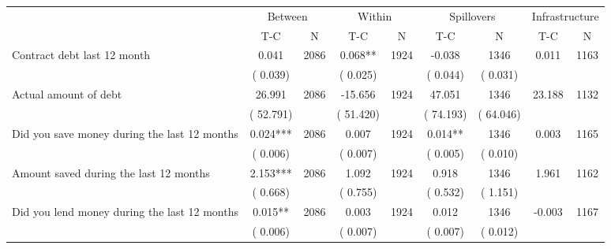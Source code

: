 
\begin{tabular}{l*{8}{c}}\hline&\multicolumn{2}{c}{Between}&\multicolumn{2}{c}{Within}&\multicolumn{2}{c}{Spillovers}&\multicolumn{2}{c}{Infrastructure}\\ \cmidrule(r){2-3}\cmidrule(l){4-5}\cmidrule(l){6-7}\cmidrule(l){8-9} & {T-C} & {N} & {T-C} & {N}  & {T-C}  & {N} & {T-C}  & {N} \\ \midrule
Contract debt last 12 month        &              0.041      &       2086       &              0.068**      &       1924       &             -0.038      &       1346  &        0.011 &       1163       \\
                       &       (       0.039)            &                               &       (       0.025)            &                               &       (       0.044)            &       (       0.031) &                  \\
Actual amount of debt        &             26.991      &       2086       &            -15.656      &       1924       &             47.051      &       1346  &       23.188 &       1132       \\
                       &       (      52.791)            &                               &       (      51.420)            &                               &       (      74.193)            &       (      64.046) &                  \\
Did you save money during the last 12 months        &              0.024***      &       2086       &              0.007      &       1924       &              0.014**      &       1346  &        0.003 &       1165       \\
                       &       (       0.006)            &                               &       (       0.007)            &                               &       (       0.005)            &       (       0.010) &                  \\
Amount saved during the last 12 months        &              2.153***      &       2086       &              1.092      &       1924       &              0.918      &       1346  &        1.961 &       1162       \\
                       &       (       0.668)            &                               &       (       0.755)            &                               &       (       0.532)            &       (       1.151) &                  \\
Did you lend money during the last 12 months        &              0.015**      &       2086       &              0.003      &       1924       &              0.012      &       1346  &       -0.003 &       1167       \\
                       &       (       0.006)            &                               &       (       0.007)            &                               &       (       0.007)            &       (       0.012) &                  \\
\hline \end{tabular}